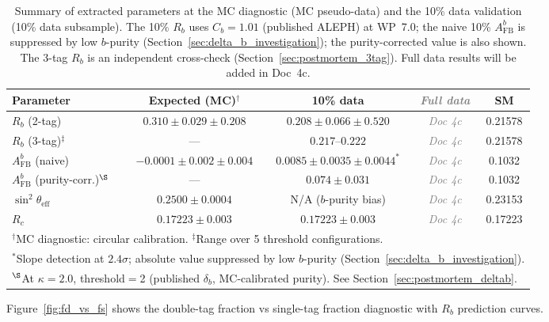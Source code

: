 \documentclass[11pt,a4paper]{article}
\newcommand{\tbd}[1]{\textcolor{gray}{\textit{#1}}}
\begin{document}
\begin{table}[htbp]
\centering
\caption{Summary of extracted parameters at the MC diagnostic (MC pseudo-data) and the 10\% data validation
(10\% data subsample). The 10\% $R_b$ uses $C_b = 1.01$ (published ALEPH) at WP~7.0;
the naive 10\% $A_\mathrm{FB}^b$ is suppressed by low $b$-purity
(Section~\ref{sec:delta_b_investigation}); the purity-corrected value is also shown.
The 3-tag $R_b$ is an independent cross-check (Section~\ref{sec:postmortem_3tag}).
Full data results will be added in Doc~4c.}
\label{tab:results_summary}
\begin{tabular}{lcccc}
\toprule
Parameter & Expected (MC)$^\dagger$ & 10\% data & \tbd{Full data} & SM \\
\midrule
$R_b$ (2-tag) & $0.310 \pm 0.029 \pm 0.208$ & $0.208 \pm 0.066 \pm 0.520$ & \tbd{Doc 4c} & 0.21578 \\
$R_b$ (3-tag)$^\ddagger$ & --- & $0.217$--$0.222$ & \tbd{Doc 4c} & 0.21578 \\
$A_\mathrm{FB}^b$ (naive) & $-0.0001 \pm 0.002 \pm 0.004$ & $0.0085 \pm 0.0035 \pm 0.0044^{*}$ & \tbd{Doc 4c} & 0.1032 \\
$A_\mathrm{FB}^b$ (purity-corr.)$^\S$ & --- & $0.074 \pm 0.031$ & \tbd{Doc 4c} & 0.1032 \\
$\sin^2\theta_\mathrm{eff}$ & $0.2500 \pm 0.0004$ & N/A ($b$-purity bias) & \tbd{Doc 4c} & 0.23153 \\
$R_c$ & $0.17223 \pm 0.003$ & $0.17223 \pm 0.003$ & \tbd{Doc 4c} & 0.17223 \\
\bottomrule
\multicolumn{5}{l}{\footnotesize $^\dagger$MC diagnostic: circular calibration. \quad
$^\ddagger$Range over 5 threshold configurations.} \\
\multicolumn{5}{l}{\footnotesize $^{*}$Slope detection at $2.4\sigma$; absolute value suppressed by
low $b$-purity (Section~\ref{sec:delta_b_investigation}).} \\
\multicolumn{5}{l}{\footnotesize $^\S$At $\kappa = 2.0$, threshold$=$2 (published $\delta_b$, MC-calibrated purity). See Section~\ref{sec:postmortem_deltab}.}
\end{tabular}
\end{table}

Figure~\ref{fig:fd_vs_fs} shows the double-tag fraction vs single-tag fraction
diagnostic with $R_b$ prediction curves.
\end{document}
